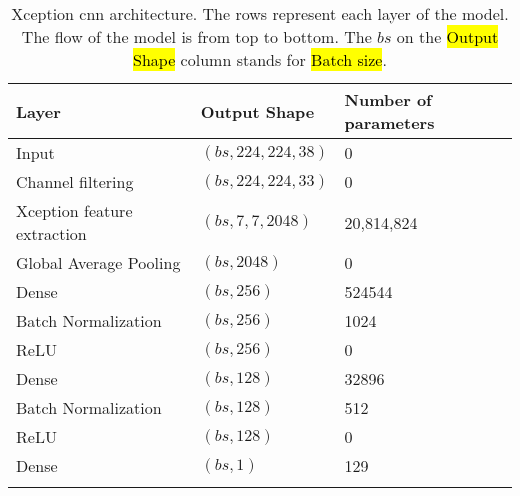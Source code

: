 \begin{longtable}{m{\mylengtha} | m{\mylengthb} | m{\mylengthc}}
    \hline
    Layer & Output Shape & Number of parameters \\
    \hline
    Input & $(bs, 224, 224, 38)$ & 0 \\
    \hline
    Channel filtering & $(bs, 224, 224, 33)$ & 0 \\
    \hline
    Xception feature extraction & $(bs, 7, 7, 2048)$ & 20,814,824 \\
    \hline
    Global Average Pooling & $(bs, 2048)$ & 0 \\
    \hline
    Dense & $(bs, 256)$ & 524544 \\
    \hline
    Batch Normalization & $(bs, 256)$ & 1024 \\
    \hline
    ReLU & $(bs, 256)$ & 0 \\
    \hline
    Dense & $(bs, 128)$ & 32896 \\
    \hline
    Batch Normalization & $(bs, 128)$ & 512 \\
    \hline
    ReLU & $(bs, 128)$ & 0 \\
    \hline
    Dense & $(bs, 1)$ & 129 \\
    \hline
  \caption{Xception \gls{cnn} architecture. The rows represent each layer of the model. The flow of the model is from top to bottom. The $bs$ on the \hl{Output Shape} column stands for \hl{Batch size}.}
  \label{table:metho:models:XC}
\end{longtable}

